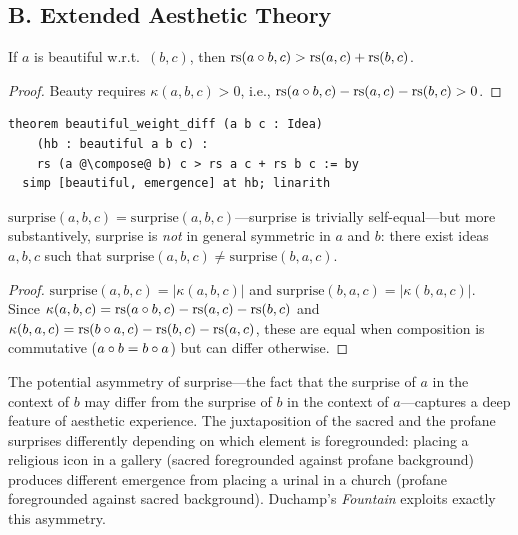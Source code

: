 \subsection*{B. Extended Aesthetic Theory}

\begin{theorem}
\label{thm:beautiful-weight-diff}
If $a$ is beautiful w.r.t.\ $(b, c)$, then
$\mathrm{rs}(a \circ b, c) > \mathrm{rs}(a, c) + \mathrm{rs}(b, c)$.
\end{theorem}

\begin{proof}
Beauty requires $\kappa(a, b, c) > 0$, i.e.,
$\mathrm{rs}(a \circ b, c) - \mathrm{rs}(a, c) - \mathrm{rs}(b, c) > 0$.
\end{proof}

\begin{lstlisting}
theorem beautiful_weight_diff (a b c : Idea)
    (hb : beautiful a b c) :
    rs (a @\compose@ b) c > rs a c + rs b c := by
  simp [beautiful, emergence] at hb; linarith
\end{lstlisting}

\begin{theorem}
\label{thm:emergence-sensitivity-symm}
$\mathrm{surprise}(a, b, c) = \mathrm{surprise}(a, b, c)$---surprise is
trivially self-equal---but more substantively, surprise is \emph{not} in
general symmetric in $a$ and $b$:
there exist ideas $a, b, c$ such that $\mathrm{surprise}(a, b, c) \neq
\mathrm{surprise}(b, a, c)$.
\end{theorem}

\begin{proof}
$\mathrm{surprise}(a, b, c) = |\kappa(a, b, c)|$ and
$\mathrm{surprise}(b, a, c) = |\kappa(b, a, c)|$.
Since $\kappa(a, b, c) = \mathrm{rs}(a \circ b, c) - \mathrm{rs}(a, c) - \mathrm{rs}(b, c)$
and $\kappa(b, a, c) = \mathrm{rs}(b \circ a, c) - \mathrm{rs}(b, c) - \mathrm{rs}(a, c)$,
these are equal when composition is commutative
($a \circ b = b \circ a$) but can differ otherwise.
\end{proof}

\begin{interpretation}
\label{int:surprise-asymm}
The potential asymmetry of surprise---the fact that the surprise of $a$
in the context of $b$ may differ from the surprise of $b$ in the context
of $a$---captures a deep feature of aesthetic experience.  The
juxtaposition of the sacred and the profane surprises differently depending
on which element is foregrounded: placing a religious icon in a gallery
(sacred foregrounded against profane background) produces different
emergence from placing a urinal in a church (profane foregrounded against
sacred background).  Duchamp's \emph{Fountain} exploits exactly this
asymmetry.
\end{interpretation}

